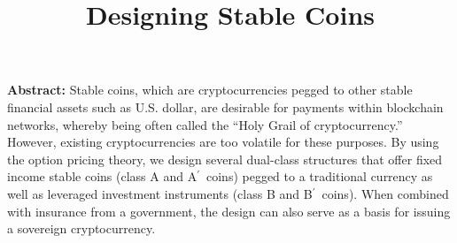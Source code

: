 \documentclass[11pt]{article}%
\numberwithin{equation}{section}
\theoremstyle{plain}
\newcommand{\Ap}{A\ensuremath{^\prime}~}
\newcommand{\Bp}{B\ensuremath{^\prime}~}
\begin{document}

\title{{\bf Designing Stable Coins}}

%
%
%
%
%
%
%



\date{\vspace{-5ex}}
\maketitle


\indent\textbf{Abstract:}
Stable coins, which are cryptocurrencies pegged to other stable financial assets such as U.S. dollar, are desirable for payments within blockchain networks, whereby being often called the ``Holy Grail of cryptocurrency.'' However, existing cryptocurrencies are too volatile for these purposes. By using the option pricing theory, we design several dual-class structures that offer fixed income stable coins (class A and \Ap coins) pegged to a traditional currency as well as leveraged investment instruments (class B and \Bp coins). When combined with insurance from a government, the design can also serve as a basis for issuing a sovereign cryptocurrency.
\end{document}
